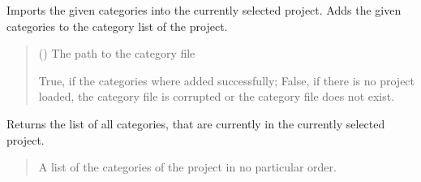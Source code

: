 \documentclass[letterpaper,10pt,english]{sphinxmanual}
\begin{document}
\begin{fulllineitems}
\begin{fulllineitems}
\label{\detokenize{apidoc/src.osm_configurator.control:src.osm_configurator.control.category_controller.CategoryController.import_category_configuration}}
\pysigstartsignatures
{}
\pysigstopsignatures
\sphinxAtStartPar
Imports the given categories into the currently selected project.
Adds the given categories to the category list of the project.
\begin{quote}\begin{description}
\sphinxAtStartPar
{} () \textendash{} The path to the category file

\sphinxAtStartPar
True, if the categories where added successfully; False, if there is no project loaded, the category file is corrupted or the category file does not exist.

\sphinxAtStartPar
{}

\end{description}\end{quote}

\end{fulllineitems}


\begin{fulllineitems}
\label{\detokenize{apidoc/src.osm_configurator.control:src.osm_configurator.control.category_controller.CategoryController.get_list_of_categories}}
\pysigstartsignatures
{}
\pysigstopsignatures
\sphinxAtStartPar
Returns the list of all categories, that are currently in the currently selected project.
\begin{quote}\begin{description}
\sphinxAtStartPar
A list of the categories of the project in no particular order.

\sphinxAtStartPar
{}


\end{description}
\end{quote}
\end{fulllineitems}
\end{fulllineitems}
\end{document}
